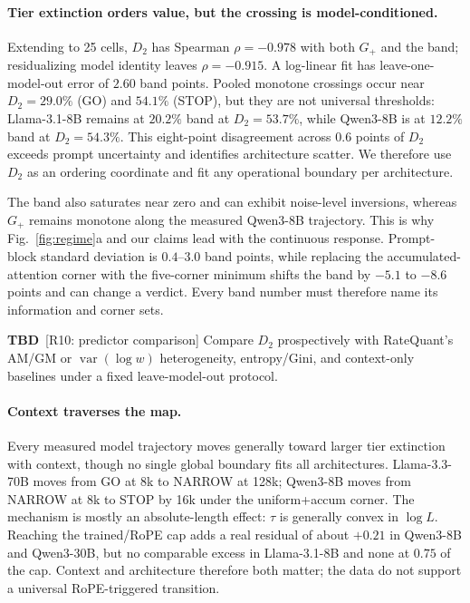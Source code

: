 \documentclass{article}
\newcommand{\tbd}[1]{{\color{tbdcol}\textbf{TBD}~#1}}
\newcommand{\gplus}{G_{+}}
\theoremstyle{definition}
\begin{document}
\paragraph{Tier extinction orders value, but the crossing is model-conditioned.}
Extending to 25 cells, $D_2$ has Spearman $\rho=-0.978$ with both $\gplus$ and the band; residualizing model identity leaves $\rho=-0.915$.  A log-linear fit has leave-one-model-out error of $2.60$ band points.  Pooled monotone crossings occur near $D_2=29.0\%$ (GO) and $54.1\%$ (STOP), but they are not universal thresholds: Llama-3.1-8B remains at $20.2\%$ band at $D_2=53.7\%$, while Qwen3-8B is at $12.2\%$ band at $D_2=54.3\%$.  This eight-point disagreement across $0.6$ points of $D_2$ exceeds prompt uncertainty and identifies architecture scatter.  We therefore use $D_2$ as an ordering coordinate and fit any operational boundary per architecture.

The band also saturates near zero and can exhibit noise-level inversions, whereas $\gplus$ remains monotone along the measured Qwen3-8B trajectory.  This is why Fig.~\ref{fig:regime}a and our claims lead with the continuous response.  Prompt-block standard deviation is $0.4$--$3.0$ band points, while replacing the accumulated-attention corner with the five-corner minimum shifts the band by $-5.1$ to $-8.6$ points and can change a verdict.  Every band number must therefore name its information and corner sets.

\tbd{[R10: predictor comparison] Compare $D_2$ prospectively with RateQuant's AM/GM or $\operatorname{var}(\log w)$ heterogeneity, entropy/Gini, and context-only baselines under a fixed leave-model-out protocol.}

\paragraph{Context traverses the map.}
Every measured model trajectory moves generally toward larger tier extinction with context, though no single global boundary fits all architectures.  Llama-3.3-70B moves from GO at 8k to NARROW at 128k; Qwen3-8B moves from NARROW at 8k to STOP by 16k under the uniform+accum corner.  The mechanism is mostly an absolute-length effect: $\tau$ is generally convex in $\log L$.  Reaching the trained/RoPE cap adds a real residual of about $+0.21$ in Qwen3-8B and Qwen3-30B, but no comparable excess in Llama-3.1-8B and none at $0.75$ of the cap.  Context and architecture therefore both matter; the data do not support a universal RoPE-triggered transition.
\end{document}

